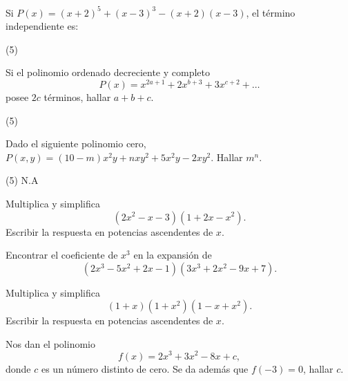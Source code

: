 \begin{multicols}{2}
    \begin{exercise}
        Si $P(x) = (x + 2)^5 + (x - 3)^3 - (x + 2)(x - 3)$, el término independiente es:
        \begin{tasks}(5)
        \end{tasks}
    \end{exercise}

    \begin{exercise}
        Si el polinomio ordenado decreciente y completo
        \[
            P(x) = x^{2a + 1} + 2x^{b + 3} + 3x^{c + 2} + \ldots
        \]
        posee $2c$ términos, hallar $a + b + c$.
        \begin{tasks}(5)
        \end{tasks}
    \end{exercise}

    \begin{exercise}
        Dado el siguiente polinomio cero, $P(x, y) = (10 - m)x^2 y + nxy^2 + 5x^2 y - 2xy^2$.
        Hallar $m^n$.
        \begin{tasks}(5)
        \task N.A
        \end{tasks}
    \end{exercise}

    \begin{exercise}
        Multiplica y simplifica
        \[
            (2x^2 - x - 3)(1 + 2x - x^2).
        \]
        Escribir la respuesta en potencias ascendentes de $x$.
    \end{exercise}

    \begin{exercise}
        Encontrar el coeficiente de $x^3$ en la expansión de
        \[
            (2x^3 - 5x^2 + 2x - 1)(3x^3 + 2x^2 - 9x + 7).
        \]
    \end{exercise}

    \begin{exercise}
        Multiplica y simplifica
        \[
            (1 + x)(1 + x^2)(1 - x + x^2).
        \]
        Escribir la respuesta en potencias ascendentes de $x$.
    \end{exercise}

    \begin{exercise}
        Nos dan el polinomio
        \[
            f(x) = 2x^3 + 3x^2 - 8x + c,
        \]
        donde $c$ es un número distinto de cero.
        Se da además que $f(-3) = 0$, hallar $c$.
    \end{exercise}


\end{multicols}

